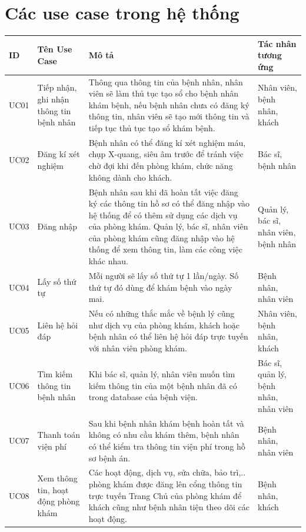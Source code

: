 \documentclass{report}
\begin{document}
\section{Các use case trong hệ thống}
	\centering
	\fontsize{13}{15}\selectfont
	\begin{longtable}{|m{1.4cm}|m{3cm}|m{6.5cm}|m{5.5cm}|} 
		\hline
			\centering\textbf{ID} & \centering\textbf{Tên Use Case} & \centering\textbf{Mô tả} & \centerline{\textbf{Tác nhân tương ứng}}\\
		\hline
			UC01 & Tiếp nhận, ghi nhận thông tin bệnh nhân 
			& Thông qua thông tin của bệnh nhân, nhân viên sẽ làm thủ tục tạo sổ cho bệnh nhân khám bệnh, nếu bệnh nhân chưa có đăng ký thông tin, nhân viên sẽ tạo mới thông tin và tiếp tục thủ tục tạo sổ khám bệnh. & Nhân viên, bệnh nhân, khách \\ 
		\hline
			UC02 & Đăng kí xét nghiệm
			& Bệnh nhân có thể đăng kí xét nghiệm máu, chụp X-quang, siêu âm trước để tránh việc chờ đợi khi đến phòng khám, chức năng không dành cho khách. & Bác sĩ, bệnh nhân \\ 
		\hline
			UC03 & Đăng nhập
			& Bệnh nhân sau khi  đã hoàn tất việc đăng ký các thông tin hồ sơ có thể đăng nhập vào hệ thống để có thêm sử dụng các dịch vụ của phòng khám. Quản lý, bác sĩ, nhân viên của phòng khám cũng đăng nhập vào hệ thống để xem thông tin, làm các công việc khác nhau. & Quản lý, bác sĩ, nhân viên, bệnh nhân \\ 
		\hline
			UC04 & Lấy số thứ tự
			& Mỗi người sẽ lấy số thứ tự 1 lần/ngày. Số thứ tự đó dùng để khám bệnh vào ngày mai. & Bệnh nhân, nhân viên\\ 
		\hline
			UC05 & Liên hệ hỏi đáp
			& Nếu có những thắc mắc về bệnh lý cũng như dịch vụ của phòng khám, khách hoặc bệnh nhân có thể liên hệ hỏi đáp trực tuyến với nhân viên phòng khám. & Nhân viên, bệnh nhân, khách \\ 
		\hline
			UC06 & Tìm kiếm thông tin bệnh nhân
			& Khi bác sĩ, quản lý, nhân viên muốn tìm kiếm thông tin của một bệnh nhân đã có trong database của bệnh viện. & Bác sĩ, quản lý, bệnh nhân, nhân viên\\ 
		\hline
			UC07 & Thanh toán viện phí
			& Sau khi bệnh nhân khám bệnh hoàn tất và không có nhu cầu khám thêm, bệnh nhân có thể kiểm tra thông tin viện phí trong hồ sơ bệnh án. & Bệnh nhân, nhân viên \\ 
		\hline
			UC08 & Xem thông tin, hoạt động phòng khám
			& Các hoạt động, dịch vụ, sửa chữa, bảo trì,.. phòng khám được đăng lên cổng thông tin trực tuyến Trang Chủ của phòng khám để khách cũng như bệnh nhân tiện theo dõi các hoạt động. & Bệnh nhân, khách \\ 

\end{longtable}
\end{document}
